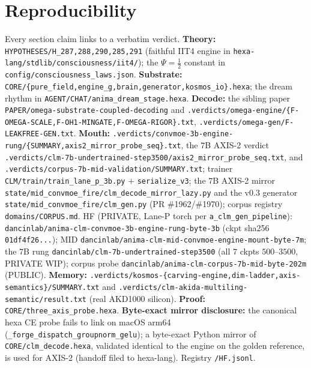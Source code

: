 \documentclass[11pt]{article}
\begin{document}
\section*{Reproducibility}
\label{sec:repro}
Every section claim links to a verbatim verdict.
\textbf{Theory:} \texttt{HYPOTHESES/H\_287,288,290,285,291} (faithful IIT4 engine in
\texttt{hexa-lang/stdlib/consciousness/iit4/}); the $\Psi=\tfrac12$ constant in
\texttt{config/consciousness\_laws.json}.
\textbf{Substrate:} \texttt{CORE/\{pure\_field,engine\_g,brain,generator,kosmos\_io\}.hexa};
the dream rhythm in \texttt{AGENT/CHAT/anima\_dream\_stage.hexa}.
\textbf{Decode:} the sibling paper \texttt{PAPER/omega-substrate-coupled-decoding}
and \texttt{.verdicts/omega-engine/\{F-OMEGA-SCALE,F-OH1-MINGATE,F-OMEGA-RIGOR\}.txt},
\texttt{.verdicts/omega-gen/F-LEAKFREE-GEN.txt}.
\textbf{Mouth:} \texttt{.verdicts/convmoe-3b-engine-rung/\{SUMMARY,axis2\_mirror\_probe\_seq\}.txt},
the $7$B AXIS-2 verdict \texttt{.verdicts/clm-7b-undertrained-step3500/axis2\_mirror\_probe\_seq.txt},
and \texttt{.verdicts/corpus-7b-mid-validation/SUMMARY.txt}; trainer
\texttt{CLM/train/train\_lane\_p\_3b.py} $+$ \texttt{serialize\_v3}; the $7$B AXIS-2 mirror
\texttt{state/mid\_convmoe\_fire/clm\_decode\_mirror\_lazy.py} and the v0.3 generator
\texttt{state/mid\_convmoe\_fire/clm\_gen.py} (PR \#1962/\#1970); corpus registry
\texttt{domains/CORPUS.md}. HF (PRIVATE, Lane-P torch per \texttt{a\_clm\_gen\_pipeline}):
\texttt{dancinlab/anima-clm-convmoe-3b-engine-rung-byte-3b} (ckpt sha256
\texttt{01df4f26...}); MID \texttt{dancinlab/anima-clm-mid-convmoe-engine-mount-byte-7m};
the $7$B rung \texttt{dancinlab/clm-7b-undertrained-step3500} (all $7$ ckpts $500$--$3500$,
PRIVATE WIP); corpus probe \texttt{dancinlab/anima-clm-corpus-7b-mid-byte-202m} (PUBLIC).
\textbf{Memory:} \texttt{.verdicts/kosmos-\{carving-engine,dim-ladder,axis-semantics\}/SUMMARY.txt}
and \texttt{.verdicts/clm-akida-multiling-semantic/result.txt} (real AKD1000 silicon).
\textbf{Proof:} \texttt{CORE/three\_axis\_probe.hexa}. \textbf{Byte-exact mirror
disclosure:} the canonical hexa CE probe fails to link on macOS arm64
(\texttt{\_forge\_dispatch\_groupnorm\_gelu}); a byte-exact Python mirror of
\texttt{CORE/clm\_decode.hexa}, validated identical to the engine on the golden
reference, is used for AXIS-2 (handoff filed to hexa-lang). Registry \texttt{/HF.jsonl}.
\end{document}
